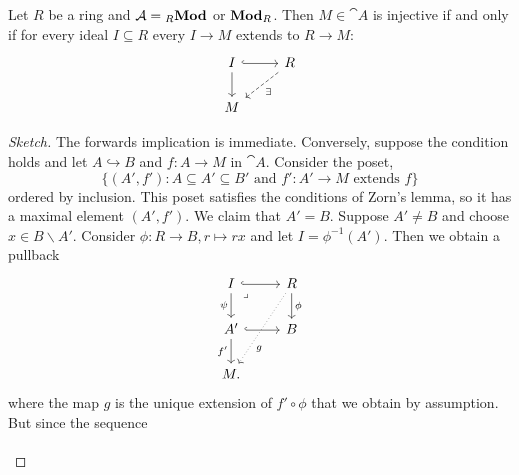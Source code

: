 \documentclass[../main.tex]{subfiles}
\begin{document}
\begin{lem}
    Let $R$ be a ring and $\cat A =  {}_R\catModule$ or $\catModule[R]$. Then $M\in \cat A$ is injective if and only if for every ideal $I\subseteq R$ every $I\to M$ extends to $R\to M$:
\[\begin{tikzcd}
	I & R \\
	M
	\arrow[hook, from=1-1, to=1-2]
	\arrow[from=1-1, to=2-1]
	\arrow["\exists", dashed, from=1-2, to=2-1]
\end{tikzcd}\]
\end{lem}
\begin{proof}[Sketch]
    The forwards implication is immediate. Conversely, suppose the condition holds and let $A\hookrightarrow B$ and $f\colon A\to M$ in $\cat A$. Consider the poset,
    \[\{(A', f')\colon A\subseteq A' \subseteq B' \text{ and } f'\colon A' \to M \text{ extends } f\}\]
    ordered by inclusion. This poset satisfies the conditions of Zorn's lemma, so it has a maximal element $(A', f')$. We claim that $A' = B$. Suppose $A' \neq B$ and choose $x\in B\backslash A'$. Consider $\phi\colon R \to B, r\mapsto rx$ and let $I = \phi^{-1}(A')$. Then we obtain a pullback
    \[\begin{tikzcd}
    	I & R \\
    	{A'} & B \\
    	M.
    	\arrow[hook, from=1-1, to=1-2]
    	\arrow["\psi"', from=1-1, to=2-1]
    	\arrow["\lrcorner"{anchor=center, pos=0.125}, draw=none, from=1-1, to=2-2]
    	\arrow["\phi", from=1-2, to=2-2]
    	\arrow["g"{pos=0.7}, dotted, from=1-2, to=3-1]
    	\arrow[hook, from=2-1, to=2-2]
    	\arrow["{f'}"', from=2-1, to=3-1]
    \end{tikzcd}\]
    where the map $g$ is the unique extension of $f'\circ \phi$ that we obtain by assumption. But since the sequence
    \[\begin{tikzcd}[column sep=scriptsize]

\end{tikzcd}\]
\end{proof}
\end{document}
